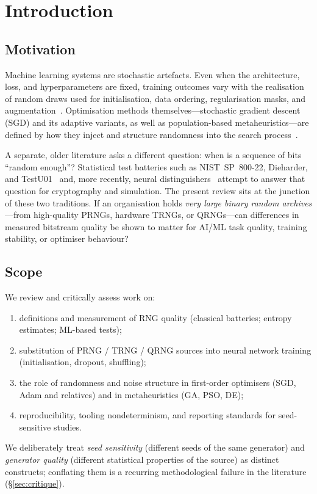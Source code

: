 \section{Introduction}
\label{sec:intro}

\subsection{Motivation}

Machine learning systems are stochastic artefacts.
Even when the architecture, loss, and hyperparameters are fixed, training outcomes vary with the realisation of random draws used for initialisation, data ordering, regularisation masks, and augmentation~\cite{summers2021nondeterminism,zhuang2022randomness,pham2022quantifying}.
Optimisation methods themselves---stochastic gradient descent (SGD) and its adaptive variants, as well as population-based metaheuristics---are defined by how they inject and structure randomness into the search process~\cite{keskar2017largebatch,smith2018bayesian,zhu2019anisotropic}.

A separate, older literature asks a different question: when is a sequence of bits ``random enough''?
Statistical test batteries such as NIST~SP~800-22, Dieharder, and TestU01~\cite{bassham2010nist,lecuyer2007testu01} and, more recently, neural distinguishers~\cite{valle2024assessing} attempt to answer that question for cryptography and simulation.
The present review sits at the junction of these two traditions.
If an organisation holds \emph{very large binary random archives}---from high-quality PRNGs, hardware TRNGs, or QRNGs---can differences in measured bitstream quality be shown to matter for AI/ML task quality, training stability, or optimiser behaviour?

\subsection{Scope}

We review and critically assess work on:
\begin{enumerate}[leftmargin=*]
  \item definitions and measurement of RNG quality (classical batteries; entropy estimates; ML-based tests);
  \item substitution of PRNG / TRNG / QRNG sources into neural network training (initialisation, dropout, shuffling);
  \item the role of randomness and noise structure in first-order optimisers (SGD, Adam and relatives) and in metaheuristics (GA, PSO, DE);
  \item reproducibility, tooling nondeterminism, and reporting standards for seed-sensitive studies.
\end{enumerate}
We deliberately treat \emph{seed sensitivity} (different seeds of the same generator) and \emph{generator quality} (different statistical properties of the source) as distinct constructs; conflating them is a recurring methodological failure in the literature (\S\ref{sec:critique}).

